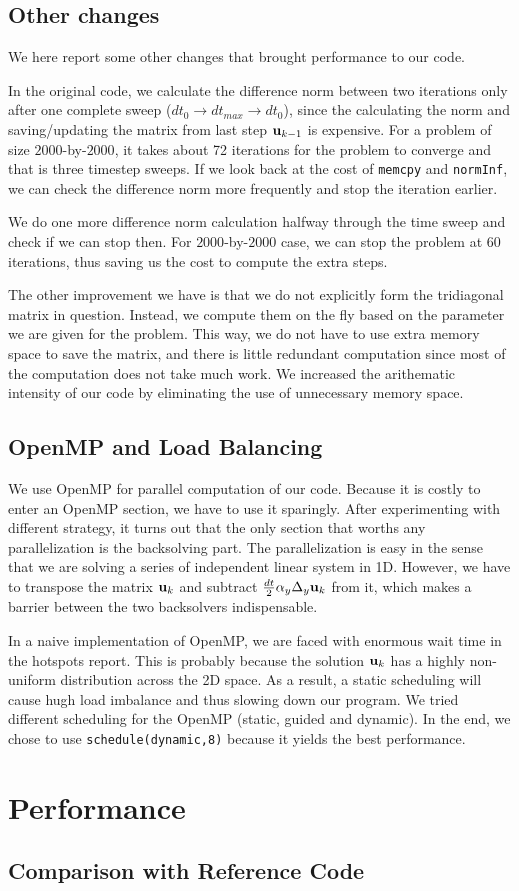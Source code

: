 \documentclass[a4paper,11pt]{article}
\begin{document}
\begin{multicols}{2}
	\subsection{Other changes}
	We here report some other changes that brought performance to our code.
	\par In the original code, we calculate the difference norm between two iterations only after one complete sweep ($dt_0\rightarrow dt_{max} \rightarrow dt_0$), since the calculating the norm and saving/updating the matrix from last step ${\bf u}_{k-1}$ is expensive. For a problem of size $2000$-by-$2000$, it takes about 72 iterations for the problem to converge and that is three timestep sweeps. If we look back at the cost of \verb|memcpy| and \verb|normInf|, we can check the difference norm more frequently and stop the iteration earlier.
	\par We do one more difference norm calculation halfway through the time sweep and check if we can stop then. For $2000$-by-$2000$ case, we can stop the problem at 60 iterations, thus saving us the cost to compute the extra steps.
	\par The other improvement we have is that we do not explicitly form the tridiagonal matrix in question. Instead, we compute them on the fly based on the parameter we are given for the problem. This way, we do not have to use extra memory space to save the matrix, and there is little redundant computation since most of the computation does not take much work. We increased the arithematic intensity of our code by eliminating the use of unnecessary memory space. 
	\subsection{OpenMP and Load Balancing}
    We use OpenMP for parallel computation of our code. Because it is costly to enter an OpenMP section, we have to use it sparingly. After experimenting with different strategy, it turns out that the only section that worths any parallelization is the backsolving part. The parallelization is easy in the sense that we are solving a series of independent linear system in 1D. However, we have to transpose the matrix ${\bf u}_k$ and subtract $\frac{dt}{2}\alpha_y\Delta_y {\bf u}_k$ from it, which makes a barrier between the two backsolvers indispensable.
    \par In a naive implementation of OpenMP, we are faced with enormous wait time in the hotspots report. This is probably because the solution ${\bf u}_k$ has a highly non-uniform distribution across the 2D space. As a result, a static scheduling will cause hugh load imbalance and thus slowing down our program. We tried different scheduling for the OpenMP (static, guided and dynamic). In the end, we chose to use \verb|schedule(dynamic,8)| because it yields the best performance.
\section{Performance}
	\subsection{Comparison with Reference Code}
	\end{multicols}
\end{document}
